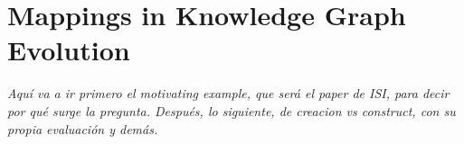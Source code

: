 
\chapter{Mappings in Knowledge Graph Evolution}
\label{chapter:reframing}

\textit{Aquí va a ir primero el motivating example, que será el paper de ISI, para decir por qué surge la pregunta. Después, lo siguiente, de creacion vs construct, con su propia evaluación y demás.}

